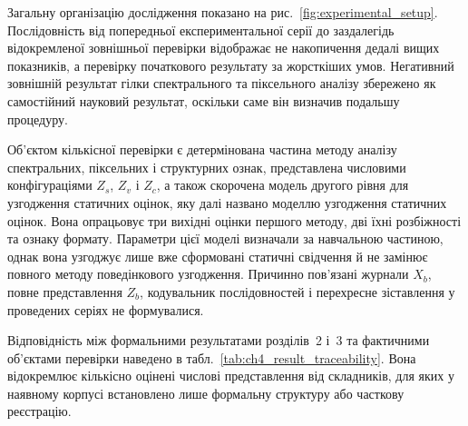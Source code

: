 Загальну організацію дослідження показано на рис.~\ref{fig:experimental_setup}. Послідовність від попередньої експериментальної серії до заздалегідь відокремленої зовнішньої перевірки відображає не накопичення дедалі вищих показників, а перевірку початкового результату за жорсткіших умов. Негативний зовнішній результат гілки спектрального та піксельного аналізу збережено як самостійний науковий результат, оскільки саме він визначив подальшу процедуру.



Об’єктом кількісної перевірки є детермінована частина методу аналізу спектральних, піксельних і структурних ознак, представлена числовими конфігураціями $Z_s$, $Z_v$ і $Z_c$, а також скорочена модель другого рівня для узгодження статичних оцінок, яку далі названо моделлю узгодження статичних оцінок. Вона опрацьовує три вихідні оцінки першого методу, дві їхні розбіжності та ознаку формату. Параметри цієї моделі визначали за навчальною частиною, однак вона узгоджує лише вже сформовані статичні свідчення й не замінює повного методу поведінкового узгодження. Причинно пов’язані журнали $X_b$, повне представлення $Z_b$, кодувальник послідовностей і перехресне зіставлення у проведених серіях не формувалися.

Відповідність між формальними результатами розділів~2 і~3 та фактичними об’єктами перевірки наведено в табл.~\ref{tab:ch4_result_traceability}. Вона відокремлює кількісно оцінені числові представлення від складників, для яких у наявному корпусі встановлено лише формальну структуру або часткову реєстрацію.

